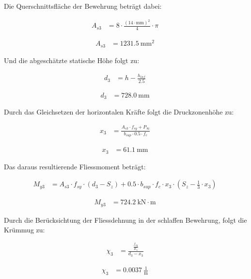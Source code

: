 \documentclass[
  11pt,
  letterpaper,
]{scrreprt}
\begin{document}
Die Querschnittsfläche der Bewehrung beträgt dabei:

$$
\begin{aligned}
A_{s3} &= 8 \cdot \frac{ \left( 14 \cdot \mathrm{mm} \right) ^{ 2 } }{ 4 } \cdot \pi \; 
\end{aligned}
$$

$$
\begin{aligned}
A_{s3} &= 1231.5\ \mathrm{mm}^{2} \;
\end{aligned}
$$

Und die abgeschätzte statische Höhe folgt zu:

$$
\begin{aligned}
d_{3} &= h - \frac{ h_{inf} }{ 2.5 } \; 
\end{aligned}
$$

$$
\begin{aligned}
d_{3} &= 728.0\ \mathrm{mm} \;
\end{aligned}
$$

Durch das Gleichsetzen der horizontalen Kräfte folgt die Druckzonenhöhe
zu:

$$
\begin{aligned}
x_{3} &= \frac{ A_{s3} \cdot f_{sy} + P_{\infty} }{ b_{sup} \cdot 0.5 \cdot f_{c} } \; 
\end{aligned}
$$

$$
\begin{aligned}
x_{3} &= 61.1\ \mathrm{mm} \;
\end{aligned}
$$

Das daraus resultierende Fliessmoment beträgt:

$$
\begin{aligned}
M_{y3} &= A_{s3} \cdot f_{sy} \cdot \left( d_{3} - S_{z} \right) + 0.5 \cdot b_{sup} \cdot f_{c} \cdot x_{3} \cdot \left( S_{z} - \frac{ 1 }{ 3 } \cdot x_{3} \right) \; 
\end{aligned}
$$

$$
\begin{aligned}
M_{y3} &= 724.2\ \mathrm{kN} \cdot \mathrm{m} \;
\end{aligned}
$$

Durch die Berücksichtung der Fliessdehnung in der schlaffen Bewehrung,
folgt die Krümmug zu:

$$
\begin{aligned}
\chi_{3} &= \frac{ \frac{ f_{sy} }{ E_{s} } }{ d_{3} - x_{3} } \; 
\end{aligned}
$$

$$
\begin{aligned}
\chi_{3} &= 0.0037\ \frac{1}{\mathrm{m}} \;
\end{aligned}
$$
\end{document}
